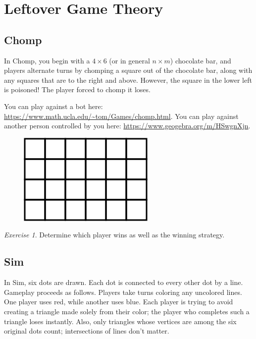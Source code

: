 \documentclass{article}
\theoremstyle{definition}
\theoremstyle{remark}
\newtheorem{exercise}{Exercise}
\begin{document}
\section{Leftover Game Theory}

\subsection{Chomp}

    In Chomp, you begin with a \(4\times 6\) (or in general \(n\times m\)) chocolate bar, and players alternate turns by chomping a square out of the chocolate bar, along with any squares that are to the right and above.
    However, the square in the lower left is poisoned!
    The player forced to chomp it loses.

    You can play against a bot here: \url{https://www.math.ucla.edu/~tom/Games/chomp.html}.
    You can play against another person controlled by you here: \url{https://www.geogebra.org/m/HSwgnXjn}.

    \begin{figure}[hbt!]
        \small
        \centering
        \includegraphics[scale = 0.4]{Pics/chomp.png}
    \end{figure}

    \begin{exercise}
        Determine which player wins as well as the winning strategy.
    \end{exercise}

\subsection{Sim}

    In Sim, six dots are drawn.
    Each dot is connected to every other dot by a line.
    Gameplay proceeds as follows.
    Players take turns coloring any uncolored lines.
    One player uses red, while another uses blue.
    Each player is trying to avoid creating a triangle made solely from their color; the player who completes such a triangle loses instantly.
    Also, only triangles whose vertices are among the six original dots count; intersections of lines don't matter.
\end{document}
